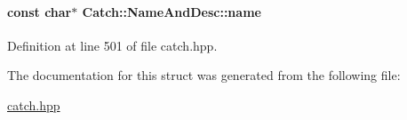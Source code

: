 \paragraph[{name}]{\setlength{\rightskip}{0pt plus 5cm}const char$\ast$ Catch\+::\+Name\+And\+Desc\+::name}\label{a00053_a374b4ed8be3cf98be20ebde5273bde51}


Definition at line 501 of file catch.\+hpp.



The documentation for this struct was generated from the following file\+:\begin{DoxyCompactItemize}
\item 
\hyperlink{a00094}{catch.\+hpp}\end{DoxyCompactItemize}
